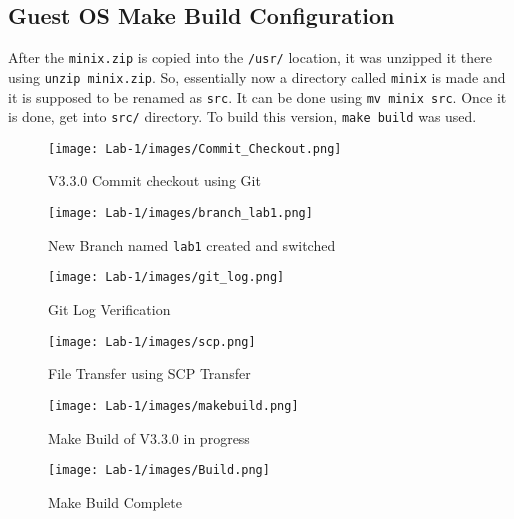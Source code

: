 \documentclass[12pt]{article}
\begin{document}
\subsection{Guest OS Make Build Configuration}
After the \texttt{minix.zip} is copied into the \texttt{/usr/} location, it was unzipped it there using \texttt{unzip minix.zip}. So, essentially now a directory called \texttt{minix} is made and it is supposed to be renamed as \texttt{src}. It can be done using \texttt{mv minix src}. Once it is done, get into \texttt{src/} directory. To build this version, \texttt{make build} was used.

\begin{figure}
    \centering
    \texttt{[image: Lab-1/images/Commit\_Checkout.png]}
    \caption{V3.3.0 Commit checkout using Git}
\end{figure}

\begin{figure}
    \centering
    \texttt{[image: Lab-1/images/branch\_lab1.png]}
    \caption{New Branch named \texttt{lab1} created and switched}
\end{figure}

\begin{figure}
    \centering
    \texttt{[image: Lab-1/images/git\_log.png]}
    \caption{Git Log Verification}
\end{figure}

\begin{figure}
    \centering
    \texttt{[image: Lab-1/images/scp.png]}
    \caption{File Transfer using SCP Transfer}
\end{figure}

\begin{figure}
    \centering
    \texttt{[image: Lab-1/images/makebuild.png]}
    \caption{Make Build of V3.3.0 in progress}
\end{figure}

\begin{figure}
    \centering
    \texttt{[image: Lab-1/images/Build.png]}
    \caption{Make Build Complete}
\end{figure}
\end{document}
